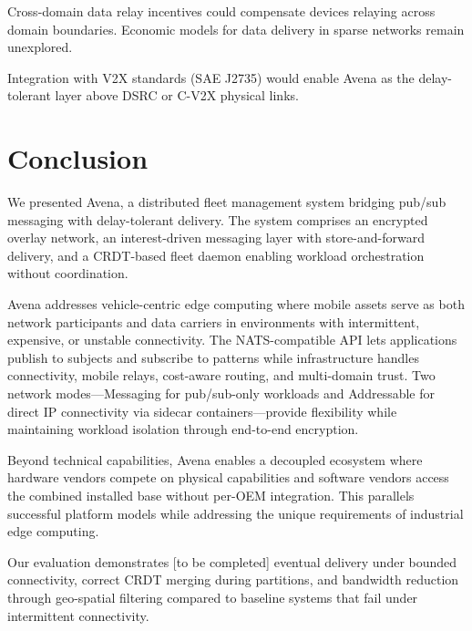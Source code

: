 \documentclass[journal]{IEEEtran}
\begin{document}
Cross-domain data relay incentives could compensate devices relaying across domain boundaries. Economic models for data delivery in sparse networks remain unexplored.

Integration with V2X standards (SAE J2735) would enable Avena as the delay-tolerant layer above DSRC or C-V2X physical links.


\section{Conclusion}
\label{sec:conclusion}

We presented Avena, a distributed fleet management system bridging pub/sub messaging with delay-tolerant delivery. The system comprises an encrypted overlay network, an interest-driven messaging layer with store-and-forward delivery, and a CRDT-based fleet daemon enabling workload orchestration without coordination.

Avena addresses vehicle-centric edge computing where mobile assets serve as both network participants and data carriers in environments with intermittent, expensive, or unstable connectivity. The NATS-compatible API lets applications publish to subjects and subscribe to patterns while infrastructure handles connectivity, mobile relays, cost-aware routing, and multi-domain trust. Two network modes---Messaging for pub/sub-only workloads and Addressable for direct IP connectivity via sidecar containers---provide flexibility while maintaining workload isolation through end-to-end encryption.

Beyond technical capabilities, Avena enables a decoupled ecosystem where hardware vendors compete on physical capabilities and software vendors access the combined installed base without per-OEM integration. This parallels successful platform models while addressing the unique requirements of industrial edge computing.

Our evaluation demonstrates [to be completed] eventual delivery under bounded connectivity, correct CRDT merging during partitions, and bandwidth reduction through geo-spatial filtering compared to baseline systems that fail under intermittent connectivity.




\end{document}
